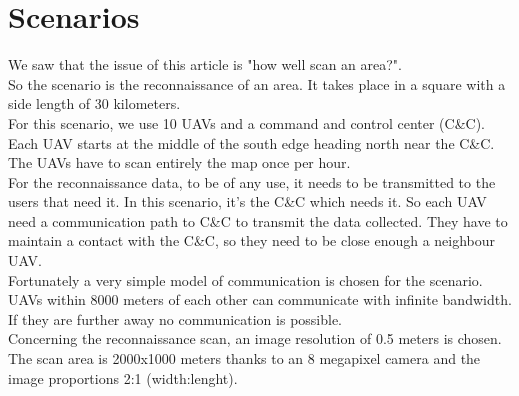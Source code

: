 \chapter{Scenarios}

We saw that the issue of this article is "how well scan an area?".\\
So the scenario is the reconnaissance of an area. It takes place in a square with a side length of 30 kilometers.\\
For this scenario, we use 10 UAVs and a command and control center (C\&C). Each UAV starts at the middle of the south edge heading north near the C\&C.
The UAVs have to scan entirely the map once per hour.\\

For the reconnaissance data, to be of any use, it needs to be transmitted to the users that need it. In this scenario, it's the C\&C which needs it. So each UAV need a communication path to C\&C to transmit the data collected. They have to maintain a contact with the C\&C, so they need to be close enough a neighbour UAV.\\
Fortunately a very simple model of communication is chosen for the scenario.  UAVs  within 8000  meters  of  each  other  can  communicate  with infinite  bandwidth.  If  they  are  further  away  no communication  is  possible.\\

Concerning the reconnaissance scan, an image resolution of 0.5 meters is chosen. The scan area is 2000x1000 meters thanks to an 8 megapixel camera and the image proportions 2:1 (width:lenght).